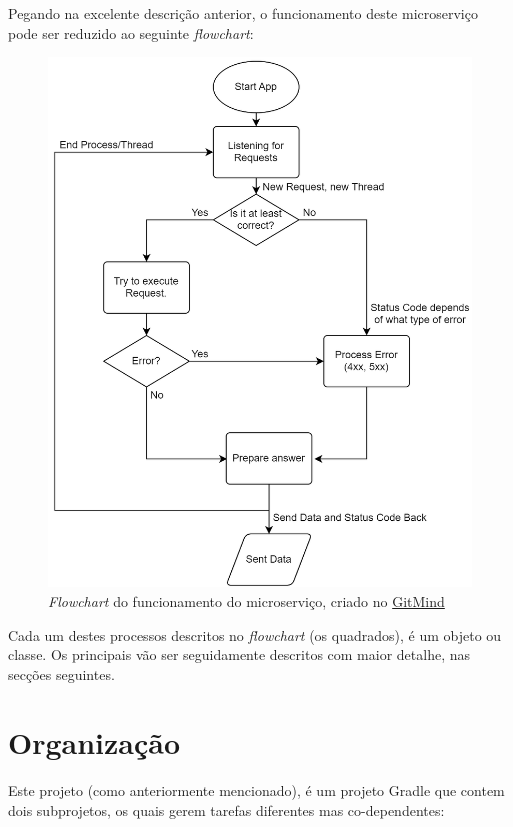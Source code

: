 Pegando na excelente descrição anterior, o funcionamento deste microserviço pode ser reduzido ao seguinte \textit{flowchart}:

\begin{figure}[!hbt]
  \centering
  \includegraphics[width=14cm]{figuras/flowchart1.png}
  \caption{\textit{Flowchart} do funcionamento do microserviço, criado no \href{https://gitmind.com/app/flowchart/ccd11723910}{GitMind}}
  \label{fig:flow1}
\end{figure}
\FloatBarrier

Cada um destes processos descritos no \textit{flowchart} (os quadrados), é um objeto ou classe. Os principais vão ser seguidamente descritos com maior detalhe, nas secções seguintes.

\newpage

\section{Organização}

Este projeto (como anteriormente mencionado), é um projeto Gradle que contem dois subprojetos, os quais gerem tarefas diferentes mas co-dependentes:

